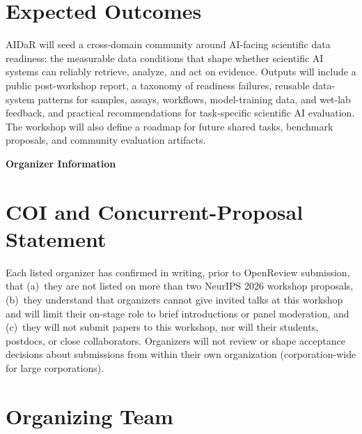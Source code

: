\documentclass[10pt]{article}
\newcommand{\currentproposalpart}{Main Workshop Proposal}
\newcommand{\setproposalpart}[1]{\gdef\currentproposalpart{#1}}
\begin{document}
\vspace{-1mm}
\section{Expected Outcomes}
AIDaR will seed a cross-domain community around AI-facing scientific data readiness: the measurable data conditions that shape whether scientific AI systems can reliably retrieve, analyze, and act on evidence. Outputs will include a public post-workshop report, a taxonomy of readiness failures, reusable data-system patterns for samples, assays, workflows, model-training data, and wet-lab feedback, and practical recommendations for task-specific scientific AI evaluation. The workshop will also define a roadmap for future shared tasks, benchmark proposals, and community evaluation artifacts.



\newpage
\setcounter{section}{0}
\setproposalpart{PART II -- Organizer Information}
\begin{center}
    \textbf{\large Organizer Information}
\end{center}


\section{COI and Concurrent-Proposal Statement}
\label{sec:org-coi}
Each listed organizer has confirmed in writing, prior to OpenReview submission, that (a)~they are not listed on more than two NeurIPS 2026 workshop proposals, (b)~they understand that organizers cannot give invited talks at this workshop and will limit their on-stage role to brief introductions or panel moderation, and (c)~they will not submit papers to this workshop, nor will their students, postdocs, or close collaborators. Organizers will not review or shape acceptance decisions about submissions from within their own organization (corporation-wide for large corporations).

\section{Organizing Team}
\label{sec:org-team}
\end{document}
